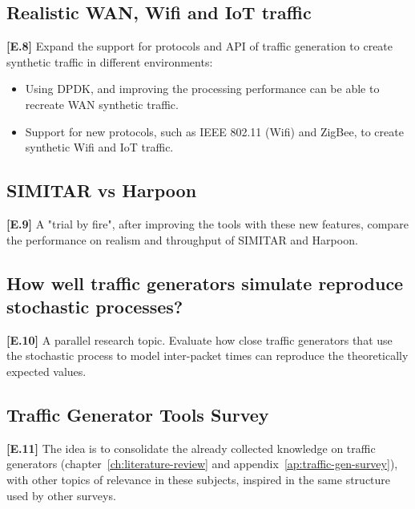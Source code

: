 \subsection{Realistic WAN, Wifi and IoT traffic}

\textbf{[E.8]} Expand the support for protocols and API of traffic generation to create synthetic traffic in different environments:
\begin{itemize}
\item Using DPDK, and improving the processing performance can be able to recreate WAN synthetic traffic. 
\item Support for new protocols, such as IEEE 802.11 (Wifi) and ZigBee, to create synthetic Wifi and IoT traffic.
\end{itemize}

\subsection{SIMITAR vs Harpoon}

\textbf{[E.9]} A "trial by fire", after improving the tools with these new features, compare the performance on realism and throughput of SIMITAR and Harpoon.

\subsection{How well traffic generators simulate reproduce stochastic processes?}

\textbf{[E.10]} A parallel research topic. Evaluate how close traffic generators that use the stochastic process to model inter-packet times can reproduce the theoretically expected values. 

\subsection{Traffic Generator Tools Survey}

\textbf{[E.11]} The idea is to consolidate the already collected knowledge on traffic generators (chapter~\ref{ch:literature-review} and appendix~\ref{ap:traffic-gen-survey}), with other topics of relevance in these subjects, inspired in the same structure used by other surveys.